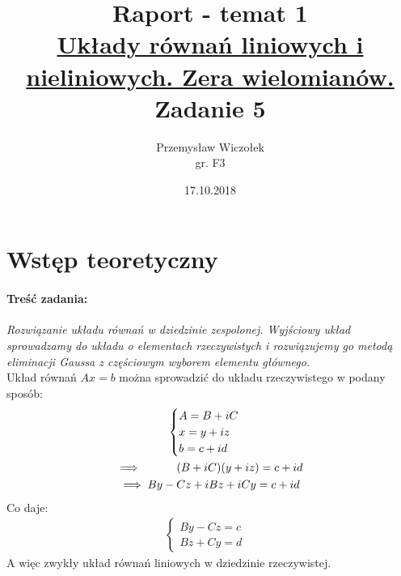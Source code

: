 \documentclass[12pt, flegn, leqno]{article}
\title{
    \Huge \textbf{Raport - temat 1} \linebreak
    \\[2pt]
    \LARGE 
    \uline{Układy równań liniowych i nieliniowych. \newline
    Zera wielomianów.} \\[5mm]
    Zadanie 5 
}
\date{17.10.2018}
\author{Przemysław Wiczołek \\ gr. F3}
\begin{document}
    \maketitle
    \newpage

    \section{Wstęp teoretyczny}
        \paragraph{Treść zadania:}
        \textit{Rozwiązanie układu równań w dziedzinie zespolonej. Wyjściowy układ
        sprowadzamy do układu o  elementach rzeczywistych i rozwiązujemy go metodą
        eliminacji Gaussa z częściowym wyborem elementu głównego.} \\[5mm]
        Układ równań $Ax = b$ można sprowadzić do układu rzeczywistego w podany sposób:
        \begin{gather*}
            \begin{cases}
                A = B + iC &\\
                x = y + iz &\\
                b = c + id &
            \end{cases} \\
            \implies \hspace{10mm} (B+iC)(y+iz) = c + id \\
            \implies By - Cz + iBz + iCy  = c + id 
        \end{gather*} 
        Co daje:
        \begin{gather*}
            \begin{cases}
                By - Cz = c &\\
                Bz + Cy = d &
            \end{cases}
        \end{gather*}
        A więc zwykły układ równań liniowych w dziedzinie rzeczywistej.
\end{document}

